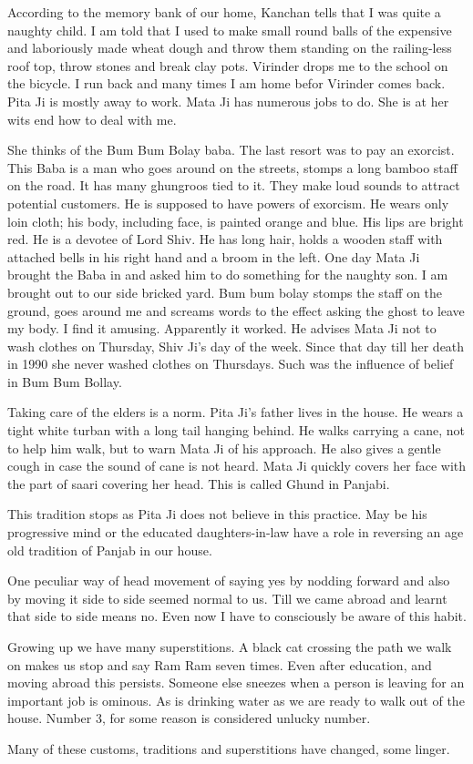 According to the memory bank of our home, Kanchan tells that I was quite
a naughty child. I am told that I used to make small round balls of the
expensive and laboriously made wheat dough and throw them standing on the
railing-less roof top, throw stones and break clay pots. Virinder drops me
to the school on the bicycle. I run back and many times I am home befor
Virinder comes back. Pita Ji is mostly away to work. Mata Ji has numerous
jobs to do. She is at her wits end how to deal with me. 

She thinks of the Bum Bum Bolay baba. The last resort was to pay an
exorcist. This Baba is a man who goes around on the streets, stomps a long
bamboo staff on the road. It has many ghungroos tied to it. They make loud
sounds to attract potential customers. He is supposed to have powers of
exorcism. He wears only loin cloth; his body, including face, is painted
orange and blue. His lips are bright red. He is a devotee of Lord Shiv. He
has long hair, holds a wooden staff with attached bells in his right hand
and a broom in the left. One day Mata Ji brought the Baba in and asked him
to do something for the naughty son. I am brought out to our side bricked
yard. Bum bum bolay stomps the staff on the ground, goes around me and
screams words to the effect asking the ghost to leave my body. I find it
amusing. Apparently it worked. He advises Mata Ji not to wash clothes on
Thursday, Shiv Ji’s day of the week. Since that day till her death in 1990
she never washed clothes on Thursdays. Such was the influence of belief in
Bum Bum Bollay. 

Taking care of the elders is a norm. Pita Ji’s father lives in the house.
He wears a tight white turban with a long tail hanging behind. He walks
carrying a cane, not to help him walk, but to warn Mata Ji of his
approach. He also gives a gentle cough in case the sound of cane is not
heard. Mata Ji quickly covers her face with the part of saari covering her
head. This is called Ghund in Panjabi. 

This tradition stops as Pita Ji does not believe in this practice. May be
his progressive mind or the educated daughters-in-law have a role in
reversing an age old tradition of Panjab in our house. 

One peculiar way of head movement of saying yes by nodding forward and
also by moving it side to side seemed normal to us. Till we came abroad
and learnt that side to side means no. Even now I have to consciously be
aware of this habit. 

Growing up we have many superstitions. A black cat crossing the path we
walk on makes us stop and say Ram Ram seven times. Even after education,
and moving abroad this persists. Someone else sneezes when a person is
leaving for an important job is ominous. As is drinking water as we are
ready to walk out of the house. Number 3, for some reason is considered
unlucky number.

Many of these customs, traditions and superstitions have changed, some
linger. 

